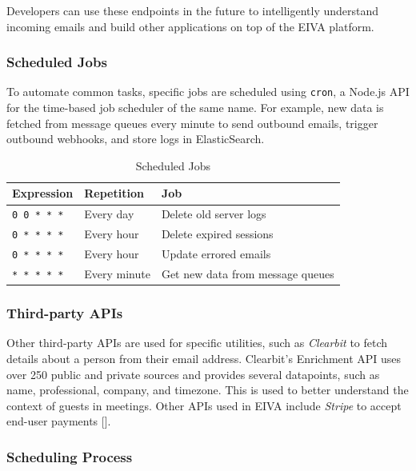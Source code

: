 \documentclass{article}
\begin{document}
Developers can use these endpoints in the future to intelligently understand incoming emails and build other applications on top of the EIVA platform.

\subsubsection{Scheduled Jobs}

To automate common tasks, specific jobs are scheduled using \texttt{cron}, a Node.js API for the time-based job scheduler of the same name. For example, new data is fetched from message queues every minute to send outbound emails, trigger outbound webhooks, and store logs in ElasticSearch.

\begin{table}[!htb]
	\begin{minipage}{1\linewidth}
		\caption{Scheduled Jobs}
		\centering
		\begin{tabular}{lll}
			\hline
			\textbf{Expression} & \textbf{Repetition} & \textbf{Job} \\
			\hline
			\texttt{0 0 * * *} & Every day & Delete old server logs \\
			\texttt{0 * * * *} & Every hour & Delete expired sessions \\
			\texttt{0 * * * *} & Every hour & Update errored emails \\
			\texttt{* * * * *} & Every minute & Get new data from message queues \\
			\hline
		\end{tabular}
	\end{minipage}%
\end{table}

\subsubsection{Third-party APIs}

Other third-party APIs are used for specific utilities, such as \emph{Clearbit} to fetch details about a person from their email address. Clearbit's Enrichment API uses over 250 public and private sources and provides several datapoints, such as name, professional, company, and timezone. This is used to better understand the context of guests in meetings. Other APIs used in EIVA include \emph{Stripe} to accept end-user payments [].

\subsubsection{Scheduling Process}
\end{document}
